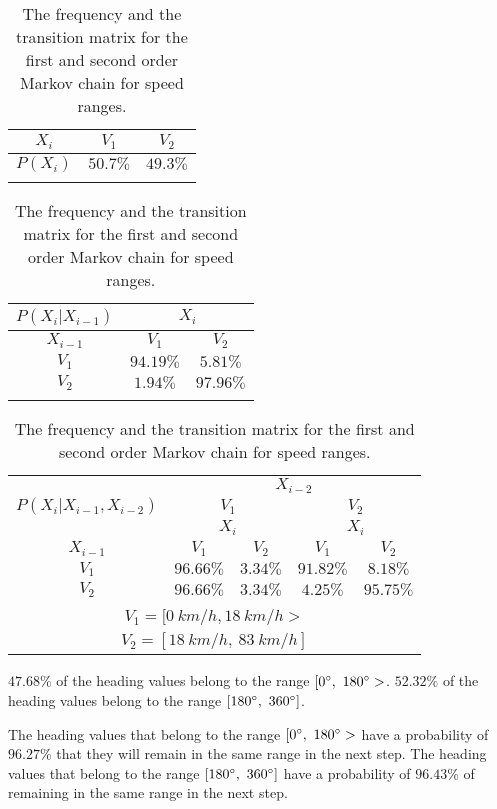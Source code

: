 \documentclass[preprint,12pt]{elsarticle}
\begin{document}
\begin{table}[!ht]
\centering
\begin{tabular}{|c|c|c|}
\hline
$X_{i}$ & $V_{1}$ & $V_{2}$\\ \hline
$P(X_{i})$ & $50.7\%$ & $49.3\%$\\ \hline
\multicolumn{3}{c}{}\\
\end{tabular}

\begin{tabular}{|c|c|c|}
\hline
$P(X_{i}|X_{i-1})$ & \multicolumn{2}{|c|}{$X_{i}$}\\ \hline
$X_{i-1}$ & $V_{1}$ & $V_{2}$\\ \hline
$V_{1}$ & $94.19\%$ & $5.81\%$\\ \hline
$V_{2}$ & $1.94\%$ & $97.96\%$\\ \hline
\multicolumn{3}{c}{}\\
\end{tabular}

\begin{tabular}{|c|c|c|c|c|}
\hline
\multirow{3}{*}{$P(X_{i}|X_{i-1},X_{i-2})$} & \multicolumn{4}{|c|}{$X_{i-2}$}\\ \cline{2-5}
 & \multicolumn{2}{|c|}{$V_{1}$} & \multicolumn{2}{|c|}{$V_{2}$}\\ \cline{2-5}
 & \multicolumn{2}{|c|}{$X_{i}$} & \multicolumn{2}{|c|}{$X_{i}$}\\ \hline
$X_{i-1}$ & $V_{1}$ & $V_{2}$ & $V_{1}$ & $V_{2}$\\ \hline
$V_{1}$ & $96.66\%$ & $3.34\%$ & $91.82\%$ & $8.18\%$\\ \hline
$V_{2}$ & $96.66\%$ & $3.34\%$ & $4.25\%$ & $95.75\%$\\ \hline
\multicolumn{5}{c}{}\\
\multicolumn{5}{c}{$V_{1} = [0 \ km/h, 18 \ km/h>$}\\
\multicolumn{5}{c}{$V_{2} = [18 \ km/h, \ 83 \ km/h]$}\\
\end{tabular}
\caption{The frequency and the transition matrix for the first and second order Markov chain for speed ranges.}
\label{tab:speed}
\end{table}

$47.68\%$ of the heading values belong to the range $[0 \degree, \ 180 \degree>$. $52.32\%$ of the heading values belong to the range $[180 \degree, \ 360 \degree]$.

The heading values that belong to the range $[0 \degree, \ 180 \degree>$ have a probability of $96.27\%$ that they will remain in the same range in the next step. The heading values that belong to the range $[180 \degree, \ 360 \degree]$ have a probability of $96.43\%$ of remaining in the same range in the next step.
\end{document}
